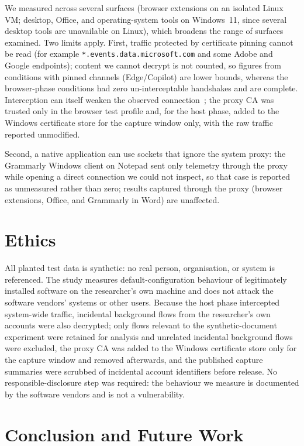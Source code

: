 \documentclass[10pt,conference,a4paper]{IEEEtran}
\begin{document}
We measured across several surfaces (browser extensions on an isolated Linux VM; desktop,
Office, and operating-system tools on Windows~11, since several desktop tools are unavailable
on Linux), which broadens the range of surfaces examined. Two limits apply. First, traffic
protected by certificate pinning cannot be read (for example
\texttt{*.events.data.microsoft.com} and some Adobe and Google endpoints); content we cannot
decrypt is not counted, so figures from conditions with pinned channels (Edge/Copilot) are
lower bounds, whereas the browser-phase conditions had zero un-interceptable handshakes and
are complete. Interception can itself weaken the observed
connection~\citep{durumeric2017https}; the proxy CA was trusted only in the browser test
profile and, for the host phase, added to the Windows certificate store for the capture
window only, with the raw traffic reported unmodified.

Second, a native application can
use sockets that ignore the system proxy: the Grammarly Windows client on Notepad sent only
telemetry through the proxy while opening a direct connection we could not inspect, so that
case is reported as unmeasured rather than zero; results captured through the proxy (browser
extensions, Office, and Grammarly in Word) are unaffected.

\section{Ethics}

All planted test data is synthetic: no real person, organisation, or system is referenced.
The study measures default-configuration behaviour of legitimately installed software on the
researcher's own machine and does not attack the software vendors' systems or other users. Because
the host phase intercepted system-wide traffic, incidental background flows from the
researcher's own accounts were also decrypted; only flows relevant to the synthetic-document
experiment were retained for analysis and unrelated incidental background flows were
excluded, the proxy CA was added to the Windows certificate store only for the capture
window and removed afterwards, and the published capture summaries were scrubbed of
incidental account identifiers before release. No responsible-disclosure step was required:
the behaviour we measure is documented by the software vendors and is not a vulnerability.

\section{Conclusion and Future Work}
\end{document}
